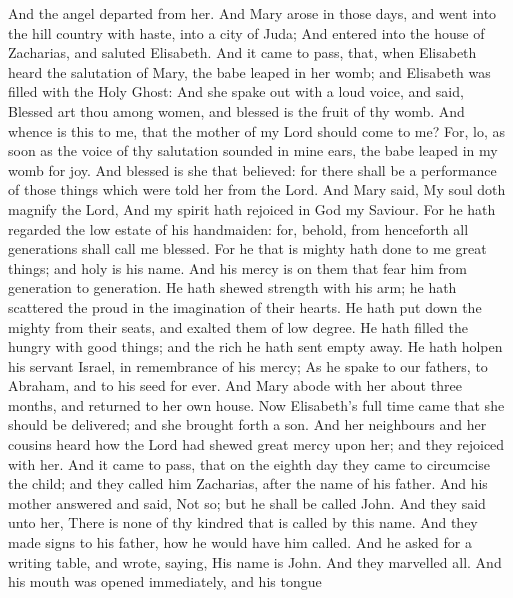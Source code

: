 And the angel departed from her.  And Mary arose in those
days, and went into the hill country with haste, into a city of Juda;
 And entered into the house of Zacharias, and saluted
Elisabeth.  And it came to pass, that, when Elisabeth heard
the salutation of Mary, the babe leaped in her womb; and Elisabeth was
filled with the Holy Ghost:  And she spake out with a loud
voice, and said, Blessed art thou among women, and blessed is the fruit
of thy womb.  And whence is this to me, that the mother of
my Lord should come to me?  For, lo, as soon as the voice
of thy salutation sounded in mine ears, the babe leaped in my womb for
joy.  And blessed is she that believed: for there shall be
a performance of those things which were told her from the Lord.
 And Mary said, My soul doth magnify the Lord,
 And my spirit hath rejoiced in God my Saviour.
 For he hath regarded the low estate of his handmaiden:
for, behold, from henceforth all generations shall call me blessed.
 For he that is mighty hath done to me great things; and
holy is his name.  And his mercy is on them that fear him
from generation to generation.  He hath shewed strength
with his arm; he hath scattered the proud in the imagination of their
hearts.  He hath put down the mighty from their seats, and
exalted them of low degree.  He hath filled the hungry with
good things; and the rich he hath sent empty away.  He hath
holpen his servant Israel, in remembrance of his mercy;  As
he spake to our fathers, to Abraham, and to his seed for ever.
 And Mary abode with her about three months, and returned
to her own house.  Now Elisabeth's full time came that she
should be delivered; and she brought forth a son.  And her
neighbours and her cousins heard how the Lord had shewed great mercy
upon her; and they rejoiced with her.  And it came to pass,
that on the eighth day they came to circumcise the child; and they
called him Zacharias, after the name of his father.  And
his mother answered and said, Not so; but he shall be called John.
 And they said unto her, There is none of thy kindred that
is called by this name.  And they made signs to his father,
how he would have him called.  And he asked for a writing
table, and wrote, saying, His name is John. And they marvelled all.
 And his mouth was opened immediately, and his tongue
